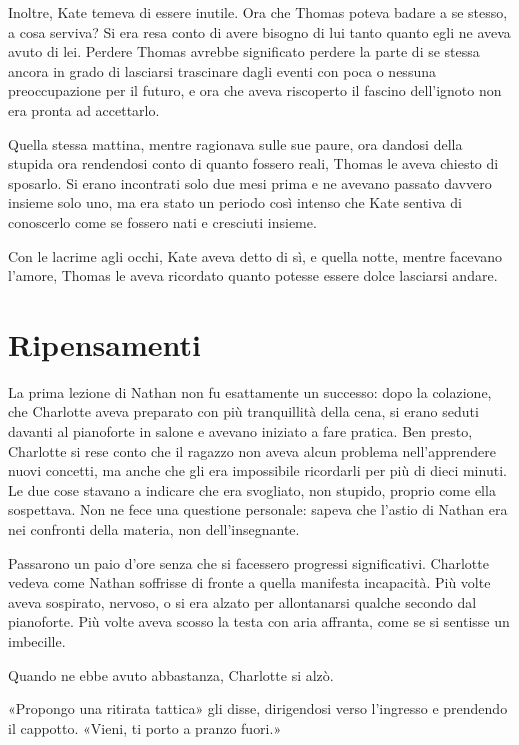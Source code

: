 \documentclass[a4paper,oneside,11pt]{memoir}
\begin{document}
Inoltre, Kate temeva di essere inutile. Ora che Thomas poteva badare a se
stesso, a cosa serviva? Si era resa conto di avere bisogno di lui tanto quanto
egli ne aveva avuto di lei. Perdere Thomas avrebbe significato perdere la parte
di se stessa ancora in grado di lasciarsi trascinare dagli eventi con poca o
nessuna preoccupazione per il futuro, e ora che aveva riscoperto il fascino
dell'ignoto non era pronta ad accettarlo.

Quella stessa mattina, mentre ragionava sulle sue paure, ora dandosi della
stupida ora rendendosi conto di quanto fossero reali, Thomas le aveva chiesto di
sposarlo. Si erano incontrati solo due mesi prima e ne avevano passato davvero
insieme solo uno, ma era stato un periodo così intenso che Kate sentiva di
conoscerlo come se fossero nati e cresciuti insieme.

Con le lacrime agli occhi, Kate aveva detto di sì, e quella notte, mentre
facevano l'amore, Thomas le aveva ricordato quanto potesse essere dolce
lasciarsi andare.

\chapter{Ripensamenti}

La prima lezione di Nathan non fu esattamente un successo: dopo la colazione,
che Charlotte aveva preparato con più tranquillità della cena, si erano seduti
davanti al pianoforte in salone e avevano iniziato a fare pratica. Ben presto,
Charlotte si rese conto che il ragazzo non aveva alcun problema nell'apprendere
nuovi concetti, ma anche che gli era impossibile ricordarli per più di dieci
minuti. Le due cose stavano a indicare che era svogliato, non stupido, proprio
come ella sospettava. Non ne fece una questione personale: sapeva che l'astio di
Nathan era nei confronti della materia, non dell'insegnante.

Passarono un paio d'ore senza che si facessero progressi significativi.
Charlotte vedeva come Nathan soffrisse di fronte a quella manifesta incapacità.
Più volte aveva sospirato, nervoso, o si era alzato per allontanarsi qualche
secondo dal pianoforte. Più volte aveva scosso la testa con aria affranta, come
se si sentisse un imbecille.

Quando ne ebbe avuto abbastanza, Charlotte si alzò.

«Propongo una ritirata tattica» gli disse, dirigendosi verso l'ingresso e
prendendo il cappotto. «Vieni, ti porto a pranzo fuori.»
\end{document}
